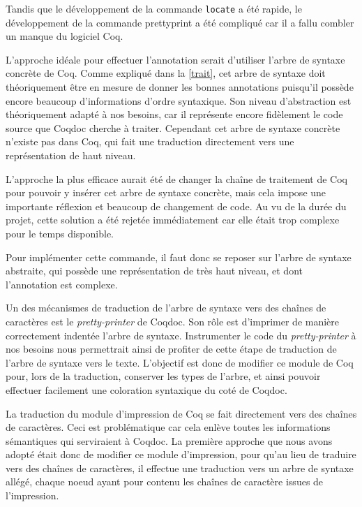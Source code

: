 \documentclass[a4paper, 11pt]{report}
\begin{document}
    Tandis que le développement de la commande \texttt{locate} a été rapide,
    le développement de la commande prettyprint a été compliqué car il a fallu
    combler un manque du logiciel Coq.

    L'approche idéale pour effectuer l'annotation serait d'utiliser
    l'arbre de syntaxe concrète de Coq. Comme expliqué dans la \cref{trait},
    cet arbre de syntaxe doit théoriquement être en mesure de donner les bonnes
    annotations puisqu'il possède encore beaucoup d'informations d'ordre
    syntaxique. Son niveau d'abstraction est théoriquement adapté à nos besoins,
    car il représente encore fidèlement le code source que Coqdoc cherche à
    traiter. Cependant cet arbre de syntaxe concrète n'existe pas dans Coq,
    qui fait une traduction directement vers une représentation de haut niveau.

    L'approche la plus efficace aurait été de changer la chaîne de traitement
    de Coq pour pouvoir y insérer cet arbre de syntaxe concrète, mais cela
    impose une importante réflexion et beaucoup de changement de code. Au
    vu de la durée du projet, cette solution a été rejetée immédiatement car
    elle était trop complexe pour le temps disponible.

    Pour implémenter cette commande, il faut donc se reposer sur l'arbre de
    syntaxe abstraite, qui possède une représentation de très haut niveau,
    et dont l'annotation est complexe.

    Un des mécanismes de traduction de l'arbre de syntaxe vers des chaînes de
    caractères est le \textit{pretty-printer} de Coqdoc. Son rôle est
    d'imprimer de manière correctement indentée l'arbre de syntaxe.
    Instrumenter le code du \textit{pretty-printer} à nos besoins nous
    permettrait ainsi de profiter de cette étape de traduction de l'arbre de
    syntaxe vers le texte. L'objectif est donc de modifier ce module de Coq
    pour, lors de la traduction, conserver les types de l'arbre, et ainsi
    pouvoir effectuer facilement une coloration syntaxique du coté de Coqdoc.

    La traduction du module d'impression de Coq se fait directement vers des
    chaînes de caractères. Ceci est problématique car cela enlève toutes les
    informations sémantiques qui serviraient à Coqdoc. La première approche
    que nous avons adopté était donc de modifier ce module d'impression, pour
    qu'au lieu de traduire vers des chaînes de caractères, il effectue une
    traduction vers un arbre de syntaxe allégé, chaque noeud ayant pour contenu
    les chaînes de caractère issues de l'impression.
\end{document}
